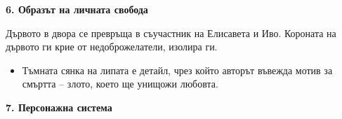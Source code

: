 \documentclass[12pt,a4paper]{article}
\begin{document}
\vspace{0.1cm}
\textbf{6. Образът на личната свобода}
\vspace{0.1cm}

\indent Дървото в двора се превръща в съучастник на Елисавета и Иво. Короната на дървото ги крие от недоброжелатели, изолира ги.

\vspace{0.1cm}
\begin{itemize}[leftmargin=*, noitemsep, topsep=2pt, parsep=0pt]
    \item Тъмната сянка на липата е детайл, чрез който авторът въвежда мотив за смъртта – злото, което ще унищожи любовта.
\end{itemize}

\vspace{0.1cm}
\textbf{7. Персонажна система}
\vspace{0.1cm}
\end{document}
